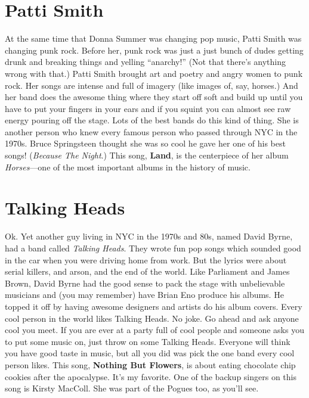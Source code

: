 \documentclass[letterpaper,single]{article}
\begin{document}
\section{Patti Smith}
At the same time that Donna Summer was changing pop music, Patti Smith
was changing punk rock. Before her, punk rock was just a just bunch of
dudes getting drunk and breaking things and yelling ``anarchy!'' (Not
that there's anything wrong with that.) Patti Smith brought art and
poetry and angry women to punk rock. Her songs are intense and full of
imagery (like images of, say, horses.) And her band does the awesome
thing where they start off soft and build up until you have to put your
fingers in your ears and if you squint you can almost see raw energy
pouring off the stage. Lots of the best bands do this kind of thing. She
is another person who knew every famous person who passed through NYC in
the 1970s. Bruce Springsteen thought she was so cool he gave her one of
his best songs! (\emph{Because The Night}.) This song, \textbf{Land}, is
the centerpiece of her album \emph{Horses}---one of the most important
albums in the history of music.

\section{Talking Heads}
Ok. Yet another guy living in NYC in the 1970s and 80s, named David
Byrne, had a band called \emph{Talking Heads}. They wrote fun pop songs
which sounded good in the car when you were driving home from work. But
the lyrics were about serial killers, and arson, and the end of the
world. Like Parliament and James Brown, David Byrne had the good sense
to pack the stage with unbelievable musicians and (you may remember)
have Brian Eno produce his albums. He topped it off by having awesome
designers and artists do his album covers. Every cool person in the
world likes Talking Heads. No joke. Go ahead and ask anyone cool you
meet. If you are ever at a party full of cool people and someone asks
you to put some music on, just throw on some Talking Heads. Everyone
will think you have good taste in music, but all you did was pick
the one band every cool person likes. This song, \textbf{Nothing But
Flowers}, is about eating chocolate chip cookies after the apocalypse.
It's my favorite. One of the backup singers on this song is Kirsty
MacColl. She was part of the Pogues too, as you'll see.
\end{document}

